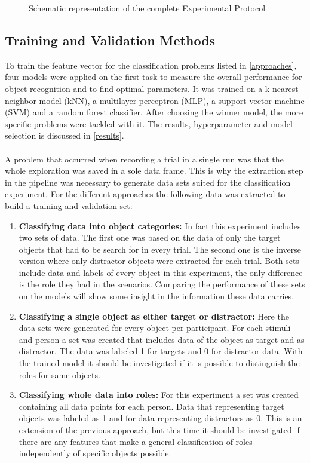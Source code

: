 \begin{figure}[h]
	\caption{Schematic representation of the complete Experimental Protocol}
	\label{pipeline}
\end{figure}

\subsection{Training and Validation Methods}
To train the feature vector for the classification problems listed in \ref{approaches}, four models were applied on the first task to measure the overall performance for object recognition and to find optimal parameters. It was trained on a k-nearest neighbor model (kNN), a multilayer perceptron (MLP), a support vector machine (SVM) and a random forest classifier. After choosing the winner model, the more specific problems were tackled with it. The results, hyperparameter and model selection is discussed in \ref{results}.\\
\\
A problem that occurred when recording a trial in a single run was that the whole exploration was saved in a sole data frame. This is why the extraction step in the pipeline was necessary to generate data sets suited for the classification experiment. For the different approaches the following data was extracted to build a training and validation set:

\begin{enumerate}
	\item \textbf{Classifying data into object categories:} In fact this experiment includes two sets of data. The first one was based on the data of only the target objects that had to be search for in every trial. The second one is the inverse version where only distractor objects were extracted for each trial. Both sets include data and labels of every object in this experiment, the only difference is the role they had in the scenarios. Comparing the performance of these sets on the models will show some insight in the information these data carries. 
	
	\item \textbf{Classifying a single object as either target or distractor:} Here the data sets were generated for every object per participant. For each stimuli and person a set was created that includes data of the object as target and as distractor. The data was labeled 1 for targets and 0 for distractor data. With the trained model it should be investigated if it is possible to distinguish the roles for same objects.   
	
	\item \textbf{Classifying whole data into roles:} For this experiment a set was created containing all data points for each person. Data that representing target objects was labeled as 1 and for data representing distractors as 0. This is an extension of the previous approach, but this time it should be investigated if there are any features that make a general classification of roles independently of specific objects possible.    
\end{enumerate}  

